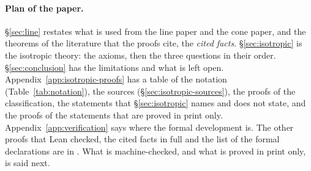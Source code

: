 \paragraph{Plan of the paper.} \S\ref{sec:line} restates what is used from the line paper and the
cone paper, and the theorems of the literature that the proofs cite, the
\emph{cited facts}.
\S\ref{sec:isotropic} is the isotropic theory: the axioms, then the three questions in their
order.
\S\ref{sec:conclusion} has the limitations and what is left open.
Appendix~\ref{app:isotropic-proofs} has a table of the notation (Table~\ref{tab:notation}), the
sources (\S\ref{sec:isotropic-sources}), the proofs of the classification, the statements that
\S\ref{sec:isotropic} names and does not state, and the proofs of the statements that are
proved in print only. Appendix~\ref{app:verification} says where the formal development is. The
other proofs that Lean checked, the cited facts in full and the list of the formal declarations are
in \suppl. \supplnumbers{} What is machine-checked, and what is proved in print only, is said
next.

